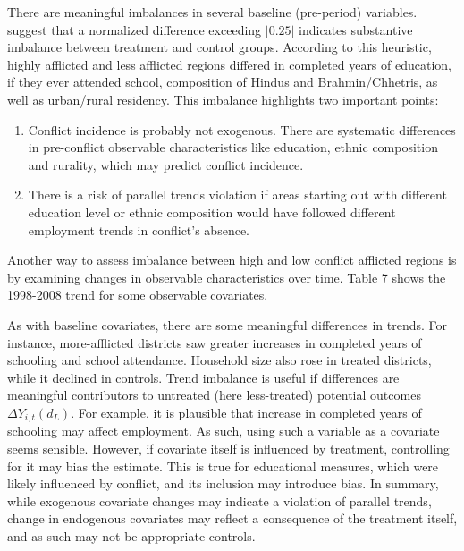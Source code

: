 \documentclass[12pt,a4paper]{article}
\begin{document}


There are meaningful imbalances in several baseline (pre-period) variables. \textcite{imbens2015causal} suggest that a normalized difference exceeding $|0.25|$ indicates substantive imbalance between treatment and control groups. According to this heuristic, highly afflicted and less afflicted regions differed in completed years of education, if they ever attended school, composition of Hindus and Brahmin/Chhetris, as well as urban/rural residency. This imbalance highlights two important points:	
\begin{enumerate}
	\item Conflict incidence is probably not exogenous. There are systematic differences in pre-conflict observable characteristics like education, ethnic composition and rurality, which may predict conflict incidence.
	
	\item There is a risk of parallel trends violation if areas starting out with different education level or ethnic composition would have followed different employment trends in conflict's absence.
\end{enumerate}

Another way to assess imbalance between high and low conflict afflicted regions is by examining changes in observable characteristics over time. Table 7 shows the 1998-2008 trend for some observable covariates. 




As with baseline covariates, there are some meaningful differences in trends. For instance, more-afflicted districts saw greater increases in completed years of schooling and school attendance. Household size also rose in treated districts, while it declined in controls. Trend imbalance is useful if differences are meaningful contributors to untreated (here less-treated) potential outcomes $\Delta Y_{i,t}(d_{L})$. For example, it is plausible that increase in completed years of schooling may affect employment. As such, using such a variable as a covariate seems sensible. However, if covariate itself is influenced by treatment, controlling for it may bias the estimate. This is true for educational measures, which were likely influenced by conflict, and its inclusion may introduce bias. In summary, while exogenous covariate changes may indicate a violation of parallel trends, change in endogenous covariates may reflect a consequence of the treatment itself, and as such may not be appropriate controls.
\end{document}
